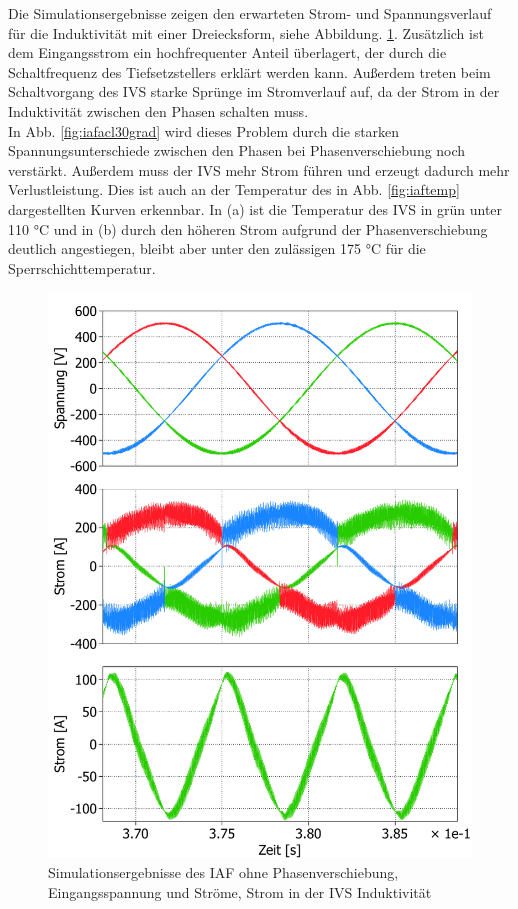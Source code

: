 Die Simulationsergebnisse zeigen den erwarteten Strom- und Spannungsverlauf für die Induktivität mit einer Dreiecksform, siehe Abbildung. \ref{fig:iafacl}. Zusätzlich ist dem Eingangsstrom ein hochfrequenter Anteil überlagert, der durch die Schaltfrequenz des Tiefsetzstellers erklärt werden kann. Außerdem treten beim Schaltvorgang des \gls{IVS} starke Sprünge im Stromverlauf auf, da der Strom in der Induktivität zwischen den Phasen schalten muss.\\
In Abb. \ref{fig:iafacl30grad} wird dieses Problem durch die starken Spannungsunterschiede zwischen den Phasen bei Phasenverschiebung noch verstärkt. Außerdem muss der \gls{IVS} mehr Strom führen und erzeugt dadurch mehr Verlustleistung. Dies ist auch an der Temperatur des in Abb. \ref{fig:iaftemp} dargestellten Kurven erkennbar. In (a) ist die Temperatur des IVS in grün unter 110 °C und in (b) durch den höheren Strom aufgrund der Phasenverschiebung deutlich angestiegen, bleibt aber unter den zulässigen 175 °C für die Sperrschichttemperatur.
\begin{figure}
	\centering
	\includegraphics[width=1\linewidth]{content/Grafiken/IAF_AC+L}
	\caption{Simulationsergebnisse des IAF ohne Phasenverschiebung, Eingangsspannung und Ströme, Strom in der IVS Induktivität }
	\label{fig:iafacl}
\end{figure}

